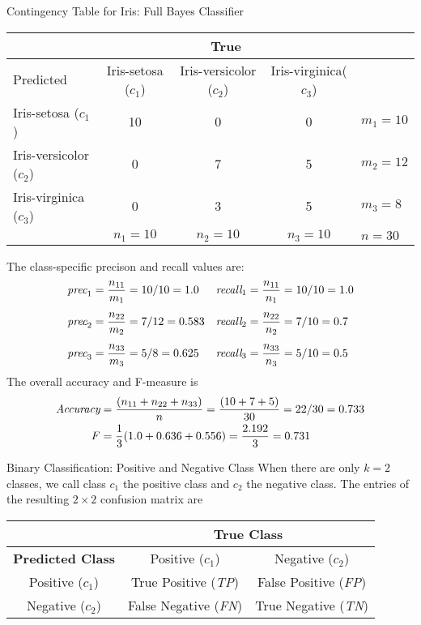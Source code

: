 \begin{frame}{Contingency Table for Iris: Full Bayes Classifier}
\renewcommand{\arraystretch}{1.1}
\begin{center}
\begin{footnotesize}
\begin{tabular}{|l||c|c|c||l|}
    \hline
    & \multicolumn{3}{c||}{True} & \\
    \hline
     Predicted & Iris-setosa ($c_1$) & Iris-versicolor ($c_2$)&
     Iris-virginica($c_3$) & \\
    \hline\hline
  Iris-setosa ($c_1$)&       10 & 0 & 0 & $m_1=10$\\
  Iris-versicolor ($c_2$)&   0  & 7 & 5 & $m_2 = 12$\\
  Iris-virginica  ($c_3$)&   0  & 3 & 5 & $m_3 = 8$\\
  \hline
  & $n_1 = 10$ & $n_2 = 10$ & $n_3 = 10$ & $n=30$\\
  \hline
  \end{tabular}%
\end{footnotesize}
\end{center}
\small
The class-specif\/{i}c
  precison and recall values are:
  \begin{align*}
    \textit{prec}_1 &= {n_{11} \over m_1}  = {10/10} = 1.0 &
    \textit{recall}_1 &= {n_{11} \over n_1}  = {10/10} = 1.0\\[4.5pt]
    \textit{prec}_2 &= {n_{22} \over m_2}  = {7/12} = 0.583 & 
    \textit{recall}_2 &= {n_{22} \over n_2}  = {7/10} = 0.7\\[4.5pt]
    \textit{prec}_3 &= {n_{33} \over m_3}  = {5/8} = 0.625 &
    \textit{recall}_3 &= {n_{33} \over n_3}  = {5/10} = 0.5
  \end{align*}
  The overall accuracy and F-measure is
  \begin{align*}
    \textit{Accuracy} & = {(n_{11} + n_{22} + n_{33}) \over n} = {(10+7+5) \over
    30} = {22/30} = 0.733\\
    F & = {1\over 3}(1.0 + 0.636 + 0.556)  = {2.192 \over 3} = 0.731
  \end{align*}

\end{frame}


\begin{frame}{Binary Classif\/{i}cation: Positive and Negative Class}
When there are only $k=2$
classes, we call class $c_1$ the positive class and $c_2$ the
negative class. The entries of the resulting $2 \times 2$
confusion matrix are
\begin{center}
\begin{tabular}{|c|c|c|}
\hline
& \multicolumn{2}{c|}{\textbf{True Class}} \\ \hline
\textbf{Predicted Class} & Positive ($c_1$) & Negative ($c_2$) \\ \hline
Positive ($c_1$)         & True Positive ({\it TP})   &  False Positive ({\it FP})  \\ \hline
Negative ($c_2$)        &  False Negative ({\it FN})  & True Negative ({\it TN})   \\ \hline
\end{tabular}
\end{center}
\end{frame}

